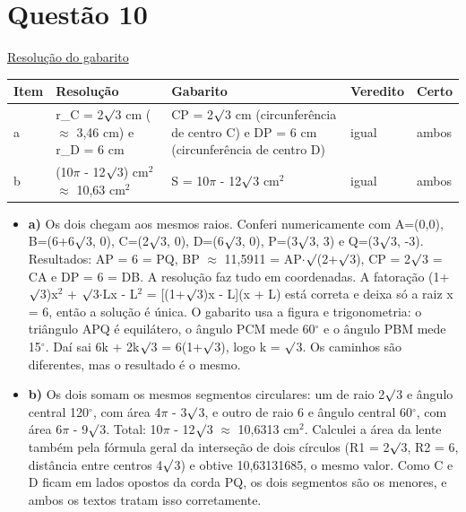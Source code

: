 \documentclass{article}%
\begin{document}
\section*{Questão 10}%
\href{https://poliedroresolve.sistemapoliedro.com.br/vestibulares/ita/2026/ita-2-fase-dia-1-28-10-2025-2-fase-dia-1/dissertativa-10-matematica-2-fase-dia-1-ita-2026}{Resolução do gabarito}\par\smallskip%
\begin{longtable}{@{}p{} p{} p{} p{} p{}@{}}\toprule Item & Resolução & Gabarito & Veredito & Certo \\ \midrule
a & r\_C = 2$\surd$3 cm ($\approx$ 3,46 cm) e r\_D = 6 cm & CP = 2$\surd$3 cm (circunferência de centro C) e DP = 6 cm (circunferência de centro D) & igual & ambos \\
b & (10$\pi$ - 12$\surd$3) cm$^2$ $\approx$ 10,63 cm$^2$ & S = 10$\pi$ - 12$\surd$3 cm$^2$ & igual & ambos \\
\bottomrule\end{longtable}%
\begin{itemize}%
\item%
\textbf{a)} Os dois chegam aos mesmos raios. Conferi numericamente com A=(0,0), B=(6+6$\surd$3, 0), C=(2$\surd$3, 0), D=(6$\surd$3, 0), P=(3$\surd$3, 3) e Q=(3$\surd$3, -3). Resultados: AP = 6 = PQ, BP $\approx$ 11,5911 = AP$\cdot$$\surd$(2+$\surd$3), CP = 2$\surd$3 = CA e DP = 6 = DB. A resolução faz tudo em coordenadas. A fatoração (1+$\surd$3)x$^2$ + $\surd$3$\cdot$Lx - L$^2$ = {[}(1+$\surd$3)x - L{]}(x + L) está correta e deixa só a raiz x = 6, então a solução é única. O gabarito usa a figura e trigonometria: o triângulo APQ é equilátero, o ângulo PCM mede 60$^\circ$ e o ângulo PBM mede 15$^\circ$. Daí sai 6k + 2k$\surd$3 = 6(1+$\surd$3), logo k = $\surd$3. Os caminhos são diferentes, mas o resultado é o mesmo.%
\item%
\textbf{b)} Os dois somam os mesmos segmentos circulares: um de raio 2$\surd$3 e ângulo central 120$^\circ$, com área 4$\pi$ - 3$\surd$3, e outro de raio 6 e ângulo central 60$^\circ$, com área 6$\pi$ - 9$\surd$3. Total: 10$\pi$ - 12$\surd$3 $\approx$ 10,6313 cm$^2$. Calculei a área da lente também pela fórmula geral da interseção de dois círculos (R1 = 2$\surd$3, R2 = 6, distância entre centros 4$\surd$3) e obtive 10,63131685, o mesmo valor. Como C e D ficam em lados opostos da corda PQ, os dois segmentos são os menores, e ambos os textos tratam isso corretamente.%
\end{itemize}%
\end{document}

